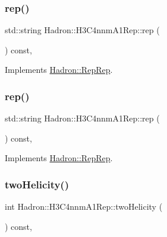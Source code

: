 \subsubsection{\texorpdfstring{rep()}{rep()}\hspace{0.1cm}{\footnotesize\ttfamily [4/5]}}
{\footnotesize\ttfamily std\+::string Hadron\+::\+H3\+C4nnm\+A1\+Rep\+::rep (\begin{DoxyParamCaption}{ }\end{DoxyParamCaption}) const\hspace{0.3cm}{\ttfamily [inline]}, {\ttfamily [virtual]}}



Implements \mbox{\hyperlink{structHadron_1_1RepRep_ab3213025f6de249f7095892109575fde}{Hadron\+::\+Rep\+Rep}}.

\mbox{\label{structHadron_1_1H3C4nnmA1Rep_acd94f02734b3fffdeddaef313469d9dc}} 
\subsubsection{\texorpdfstring{rep()}{rep()}\hspace{0.1cm}{\footnotesize\ttfamily [5/5]}}
{\footnotesize\ttfamily std\+::string Hadron\+::\+H3\+C4nnm\+A1\+Rep\+::rep (\begin{DoxyParamCaption}{ }\end{DoxyParamCaption}) const\hspace{0.3cm}{\ttfamily [inline]}, {\ttfamily [virtual]}}



Implements \mbox{\hyperlink{structHadron_1_1RepRep_ab3213025f6de249f7095892109575fde}{Hadron\+::\+Rep\+Rep}}.

\mbox{\label{structHadron_1_1H3C4nnmA1Rep_af309cb443b7986be792a59cbf09758c3}} 
\subsubsection{\texorpdfstring{twoHelicity()}{twoHelicity()}\hspace{0.1cm}{\footnotesize\ttfamily [1/3]}}
{\footnotesize\ttfamily int Hadron\+::\+H3\+C4nnm\+A1\+Rep\+::two\+Helicity (\begin{DoxyParamCaption}{ }\end{DoxyParamCaption}) const\hspace{0.3cm}{\ttfamily [inline]}, {\ttfamily [virtual]}}


